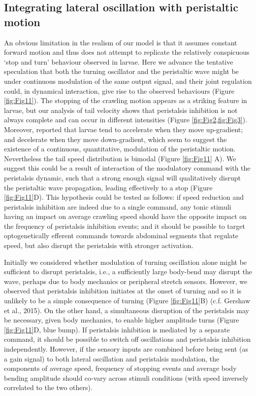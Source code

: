 \documentclass[10pt,a4paper]{article}
\begin{document}
\subsection{Integrating lateral oscillation with peristaltic motion}
An obvious limitation in the realism of our model is that it assumes constant forward motion and thus does not attempt to replicate the relatively conspicuous ‘stop and turn’ behaviour observed in larvae. Here we advance the tentative speculation that both the turning oscillator and the peristaltic wave might be under continuous modulation of the same output signal, and their joint regulation could, in dynamical interaction, give rise to the observed behaviours (Figure \ref{fig:Fig11}). The stopping of the crawling motion appears as a striking feature in larvae, but our analysis of tail velocity shows that peristalsis inhibition is not always complete and can occur in different intensities (Figure \ref{fig:Fig2,fig:Fig3}). Moreover, \cite{gomez2014multilevel} reported that larvae tend to accelerate when they move up-gradient; and decelerate when they move down-gradient, which seem to suggest the existence of a continuous, quantitative, modulation of the peristaltic motion. Nevertheless the tail speed distribution is bimodal (Figure \ref{fig:Fig11} A). We suggest this could be a result of interaction of the modulatory command with the peristalsis dynamic, such that a strong enough signal will qualitatively disrupt the peristaltic wave propagation, leading effectively to a stop (Figure \ref{fig:Fig11}D). This hypothesis could be tested as follows: if speed reduction and peristalsis inhibition are indeed due to a single command, any tonic stimuli having an impact on average crawling speed should have the opposite impact on the frequency of peristalsis inhibition events; and it should be possible to target optogenetically efferent commands towards abdominal segments that regulate speed, but also disrupt the peristalsis with stronger activation.

Initially we considered whether modulation of turning oscillation alone might be sufficient to disrupt peristalsis, i.e., a sufficiently large body-bend may disrupt the wave, perhaps due to body mechanics or peripheral stretch sensors. However, we observed that peristalsis inhibition initiates at the onset of turning and so it is unlikely to be a simple consequence of turning (Figure \ref{fig:Fig11}B) (c.f. Gershaw et al., 2015). On the other hand, a simultaneous disruption of the peristalsis may be necessary, given body mechanics, to enable higher amplitude turns (Figure \ref{fig:Fig11}D, blue bump). If peristalsis inhibition is mediated by a separate command, it should be possible to switch off oscillations and peristalsis inhibition independently.  However, if the sensory inputs are combined before being sent (as a gain signal) to both lateral oscillation and peristalsis modulation, the components of average speed, frequency of stopping events and average body bending amplitude should co-vary across stimuli conditions (with speed inversely correlated to the two others). 
\end{document}
